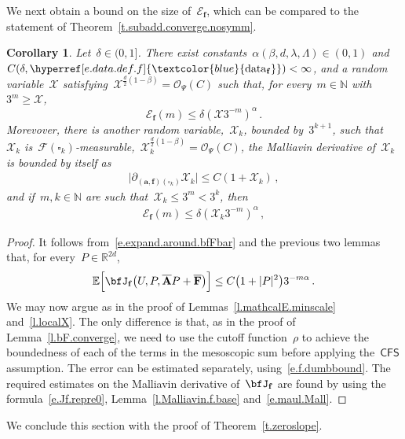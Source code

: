 \documentclass[11pt,twoside]{article} %
\let\oldsquare\square %
\renewcommand{\square}{\oldsquare}
\numberwithin{equation}{section}
\newtheorem{corollary}[theorem]{Corollary}
\theoremstyle{definition}
\newcommand{\datareff}{\hyperref[e.data.def.f]{\textcolor{blue}{\ensuremath{\mathrm{data}_{\mathbf{f}}}}}}
\newcommand*{\N}{\ensuremath{\mathbb{N}}}
\newcommand*{\R}{\ensuremath{\mathbb{R}}}
\newcommand{\f}{\mathbf{f}}
\renewcommand{\a}{\mathbf{a}}
\newcommand{\cu}{\square}
\newcommand{\F}{\mathcal{F}}
\newcommand{\E}{\mathbb{E}}
\newcommand{\X}{\mathcal{X}}
\renewcommand{\O}{\mathcal{O}}
\newcommand{\CFS}{\mathsf{CFS}}
\newcommand{\bfAhom}{\overline{\mathbf{A}}}
\newcommand{\bfF}{\mathbf{F}}
\begin{document}
We next obtain a bound on the size of~$\mathcal{E}_{\f}$, which can be compared to the statement of Theorem~\ref{t.subadd.converge.nosymm}.

\begin{corollary}
\label{c.Jf.minsetE}
Let~$\delta \in (0,1]$. 
There exist constants~$\alpha(\beta,d,\lambda,\Lambda) \in (0,1)$ and~$C(\delta,\datareff) < \infty$, 
and a random variable~$\X$ satisfying~$\X^{\frac d2 (1-\beta)} = \O_\Psi(C)$ such that, 
for every~$m\in\N$ with~$3^m\geq \X$, 
\begin{equation}
\label{e.Jf.minset.smash.again}
\mathcal{E}_{\f}(m) \leq  \delta (\X3^{-m})^{ \alpha} \,.
\end{equation}
Morevover, there is another random variable,~$\X_{k}$, bounded by~$3^{k+1}$, such that~$\X_{k}$ is~$\F(\cu_k)$-measurable,~$\X_k^{\frac d2 (1-\beta)} = \O_{\Psi}(C)$, the Malliavin derivative of~$\X_{k}$ is bounded by itself as
\begin{align} \label{e.f.mallliavin.local.again}
\bigl| \partial_{(\a,\f)(\cu_k)} \X_{k} \bigr| \leq C (1+\X_{k}) 
\,,
\end{align}
and if~$m,k \in \N$ are such that~$\X_{k} \leq 3^m < 3^k$, then
\begin{align}
\label{e.convssmaxsmax.local.again}
\mathcal{E}_{\f}(m) 
\leq
\delta  (\X_{k} 3^{-m})^{ \alpha}
\,,
\end{align}
\end{corollary}
\begin{proof}
It follows from~\eqref{e.expand.around.bfFbar} and the previous two lemmas that, for every~$P\in\R^{2d}$, 
\begin{equation}
\label{e.Jf.minsetE}
\E \Bigl[\bfJ_{\f} \bigl(U, P, \bfAhom P+ \overline{\bfF} \bigr) \Bigr]
\leq 
C\bigl( 1+ |P|^2 \bigr) 3^{-m\alpha} 
\,.
\end{equation}
We may now argue as in the proof of Lemmas~\ref{l.mathcalE.minscale} and~\ref{l.localX}.
The only difference is that, as in the proof of Lemma~\ref{l.bF.converge},  we need to use the cutoff function~$\rho$ to achieve the boundedness of each of the terms in the mesoscopic sum before applying the~$\CFS$ assumption. The error can be estimated separately, using~\eqref{e.f.dumbbound}. 
The required estimates on the Malliavin derivative of~$\bfJ_{\f}$ are found by using the formula~\eqref{e.Jf.repre0}, Lemma~\ref{l.Malliavin.f.base} and~\eqref{e.maul.Mall}. 
\end{proof}


We conclude this section with the proof of Theorem~\ref{t.zeroslope}. 
\end{document}
